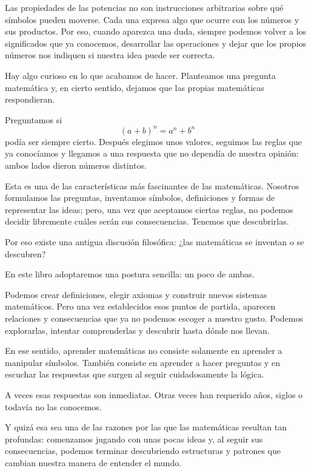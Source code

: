 Las propiedades de las potencias no son instrucciones arbitrarias sobre qué símbolos pueden moverse. Cada una expresa algo que ocurre con los números y sus productos. Por eso, cuando aparezca una duda, siempre podemos volver a los significados que ya conocemos, desarrollar las operaciones y dejar que los propios números nos indiquen si nuestra idea puede ser correcta.

\begin{note}[title=\textbf{\color{teal}{Una pequeña pausa filosófica}}]

Hay algo curioso en lo que acabamos de hacer. Planteamos una pregunta matemática y, en cierto sentido, dejamos que las propias matemáticas respondieran.

Preguntamos si
\[
(a+b)^n=a^n+b^n
\]
podía ser siempre cierto. Después elegimos unos valores, seguimos las reglas que ya conocíamos y llegamos a una respuesta que no dependía de nuestra opinión: ambos lados dieron números distintos.

Esta es una de las características más fascinantes de las matemáticas. Nosotros formulamos las preguntas, inventamos símbolos, definiciones y formas de representar las ideas; pero, una vez que aceptamos ciertas reglas, no podemos decidir libremente cuáles serán sus consecuencias. Tenemos que descubrirlas.

Por eso existe una antigua discusión filosófica: ¿las matemáticas se inventan o se descubren?

En este libro adoptaremos una postura sencilla: un poco de ambas.

Podemos crear definiciones, elegir axiomas y construir nuevos sistemas matemáticos. Pero una vez establecidos esos puntos de partida, aparecen relaciones y consecuencias que ya no podemos escoger a nuestro gusto. Podemos explorarlas, intentar comprenderlas y descubrir hasta dónde nos llevan.

En ese sentido, aprender matemáticas no consiste solamente en aprender a manipular símbolos. También consiste en aprender a hacer preguntas y en escuchar las respuestas que surgen al seguir cuidadosamente la lógica.

A veces esas respuestas son inmediatas. Otras veces han requerido años, siglos o todavía no las conocemos.

Y quizá esa sea una de las razones por las que las matemáticas resultan tan profundas: comenzamos jugando con unas pocas ideas y, al seguir sus consecuencias, podemos terminar descubriendo estructuras y patrones que cambian nuestra manera de entender el mundo.
\end{note}

